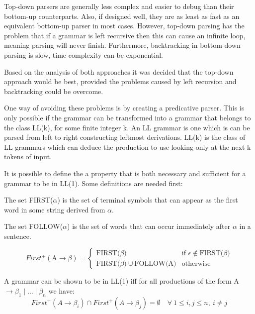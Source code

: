 Top-down parsers are generally less complex and easier to debug than their bottom-up counterparts. Also, if designed well, they are as least as fast as an equivalent bottom-up parser in most cases. \cite{cooper2011engineering} However, top-down parsing has the problem that if a grammar is left recursive then this can cause an infinite loop, meaning parsing will never finish. Furthermore, backtracking in bottom-down parsing is slow,  time complexity can be exponential. 

Based on the analysis of both approaches it was decided that the top-down approach would be best, provided the problems caused by left recursion and backtracking could be overcome. 


One way of avoiding these problems is by creating a predicative parser. This is only possible if the grammar can be transformed into a grammar that belongs to the class LL(k), for some finite integer k. An LL grammar is one which is can be parsed from left to right constructing leftmost derivations.  LL(k) is the class of LL grammars which can deduce the production to use looking only at the next k tokens of input. 

It is possible to define the a property that is both necessary and sufficient for a grammar to be in LL(1). Some definitions are needed first:

\begin{FIRST}

The set FIRST($\alpha$) is the set of terminal symbols that can appear as the first word in some string derived from $\alpha$.
\end{FIRST}
\begin{FOLLOW}
The set FOLLOW($\alpha$) is the set of words that can occur immediately after $\alpha$ in a sentence.
\end{FOLLOW}

\begin{FIRST+}

\[
First^{+} (\text{A} \to \beta) = 
  \begin{cases}
   \text{FIRST(}\beta \text{)} & \text{if } \epsilon \notin \text{FIRST(}\beta \text{)} \\
  \text{FIRST(}\beta \text{)} \cup \text{FOLLOW(A)} & \text{otherwise}
  \end{cases}
\]

\end{FIRST+}

\noindent A grammar can be shown to be in LL(1) iff for all productions of the form A $ \to \beta_1 \mid \ldots \mid \beta_n $ we have: 
\begin{equation}
 First^{+} (A \to \beta_i) \cap First^{+} (A \to \beta_j) = \emptyset \quad \forall \: 1 \le i,j \le n, \: i \not= j 
\end{equation}

